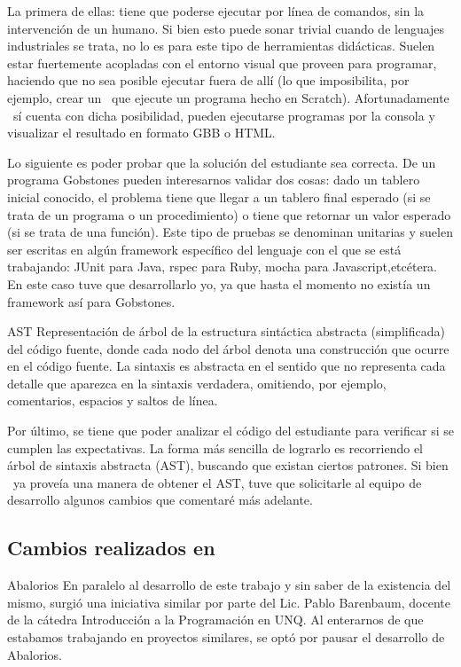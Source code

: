 La primera de ellas: tiene que poderse ejecutar por línea de comandos, sin la intervención de un humano. Si bien esto puede sonar trivial cuando de lenguajes industriales se trata, no lo es para este tipo de herramientas didácticas. Suelen estar fuertemente acopladas con el entorno visual que proveen para programar, haciendo que no sea posible ejecutar fuera de allí (lo que imposibilita, por ejemplo, crear un \runner\ que ejecute un programa hecho en Scratch). Afortunadamente \pyGob\ sí cuenta con dicha posibilidad, pueden ejecutarse programas por la consola y visualizar el resultado en formato GBB o HTML.

Lo siguiente es poder probar que la solución del estudiante sea correcta. De un programa Gobstones pueden interesarnos validar dos cosas: dado un tablero inicial conocido, el problema tiene que llegar a un tablero final esperado (si se trata de un programa o un procedimiento) o tiene que retornar un valor esperado (si se trata de una función). Este tipo de pruebas se denominan unitarias y suelen ser escritas en algún framework específico del lenguaje con el que se está trabajando: JUnit para Java, rspec para Ruby, mocha para Javascript,etcétera. En este caso tuve que desarrollarlo yo, ya que hasta el momento no existía un framework así para Gobstones.

\sepfootnotecontent
  {AST}
  {Representación de árbol de la estructura sintáctica abstracta (simplificada) del código fuente, donde cada nodo del árbol denota una construcción que ocurre en el código fuente. La sintaxis es abstracta en el sentido que no representa cada detalle que aparezca en la sintaxis verdadera, omitiendo, por ejemplo, comentarios, espacios y saltos de línea.}

Por último, se tiene que poder analizar el código del estudiante para verificar si se cumplen las expectativas. La forma más sencilla de lograrlo es recorriendo el árbol de sintaxis abstracta (AST), buscando que existan ciertos patrones. Si bien \pyGob\ ya proveía una manera de obtener el AST, tuve que solicitarle al equipo de desarrollo algunos cambios que comentaré más adelante.

\subsection{Cambios realizados en \pyGob}
\sepfootnotecontent
  {Abalorios}
  {En paralelo al desarrollo de este trabajo y sin saber de la existencia del mismo, surgió una iniciativa similar por parte del Lic. Pablo Barenbaum, docente de la cátedra Introducción a la Programación en UNQ. Al enterarnos de que estabamos trabajando en proyectos similares, se optó por pausar el desarrollo de Abalorios.}

